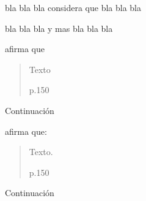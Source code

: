 

bla bla bla \textcite{bibKey} considera que bla bla bla

bla bla bla y mas bla bla bla \Parencite{bibKey}



\textcite{bibKey} afirma que \blockquote[p.150]{Texto}. Continuación





\textcite{bibKey} afirma que: \blockquote[p.150]{Texto.} Continuación


